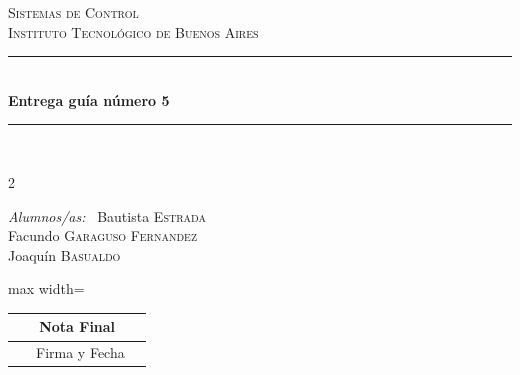 \documentclass[10pt]{article}
\newcommand{\HRule}{\rule{\linewidth}{0.5mm}}
\begin{document}
\begin{center}

\textsc{\LARGE Sistemas de Control}\\[0.2cm]
\textsc{\Large Instituto Tecnológico de Buenos Aires}\\[0.2cm]

\HRule \\[0.2cm]
{ \huge \bfseries Entrega guía número 5 \\[0.2cm] }
\HRule \\[1cm]

\begin{multicols}{2}


\columnbreak
{\raggedright
\large
\emph{Alumnos/as:} \ Bautista \textsc{Estrada} \\
\hspace*{2.5cm} Facundo \textsc{Garaguso Fernandez}\\
\hspace*{2.5cm} Joaquín \textsc{Basualdo}\\
}
\end{multicols}

\vspace{0.5cm}

\begin{adjustbox}{max width=\textwidth}
\renewcommand{\arraystretch}{1.5}
  \begin{tabular}{|l|c|}
    \hline
    \ \ \ Nota Final    &              \\ \hline \hline
    \ \ \ Firma y Fecha &              \\ \hline
  \end{tabular}
\end{adjustbox}

\end{center}

\vspace{0.2cm}

\pagestyle{fancy}
\headheight=60pt

\newpage
\end{document}
